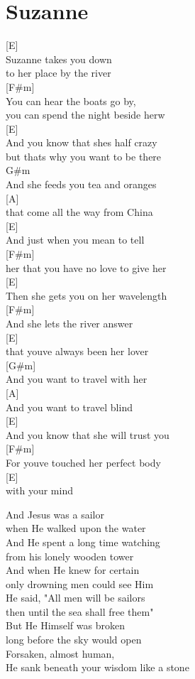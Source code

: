 \documentclass[
  letterpaper,
]{scrbook}
\begin{document}
\hypertarget{suzanne}{%
\chapter{Suzanne}\label{suzanne}}

{[}E{]}\\
Suzanne takes you down\\
to her place by the river\\
{[}F\#m{]}\\
You can hear the boats go by,\\
you can spend the night beside herw\\
{[}E{]}\\
And you know that she\textquotesingle s half crazy\\
but that\textquotesingle s why you want to be there\\
G\#m\\
And she feeds you tea and oranges\\
{[}A{]}\\
that come all the way from China\\
{[}E{]}\\
And just when you mean to tell\\
{[}F\#m{]}\\
her that you have no love to give her\\
{[}E{]}\\
Then she gets you on her wavelength\\
{[}F\#m{]}\\
And she lets the river answer\\
{[}E{]}\\
that you\textquotesingle ve always been her lover\\
{[}G\#m{]}\\
And you want to travel with her\\
{[}A{]}\\
And you want to travel blind\\
{[}E{]}\\
And you know that she will trust you\\
{[}F\#m{]}\\
For you\textquotesingle ve touched her perfect body\\
{[}E{]}\\
with your mind

And Jesus was a sailor\\
when He walked upon the water\\
And He spent a long time watching\\
from his lonely wooden tower\\
And when He knew for certain\\
only drowning men could see Him\\
He said, "All men will be sailors\\
then until the sea shall free them"\\
But He Himself was broken\\
long before the sky would open\\
Forsaken, almost human,\\
He sank beneath your wisdom like a stone
\end{document}
